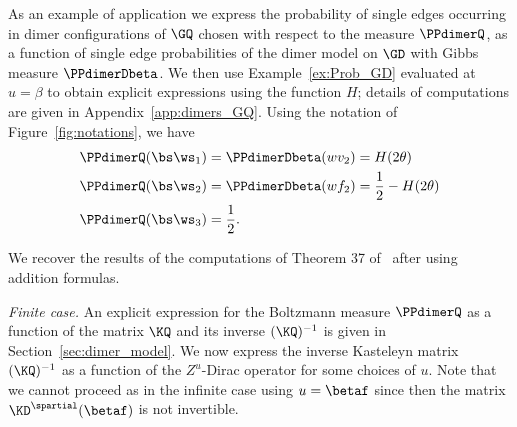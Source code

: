 \documentclass[a4paper,twoside,11pt]{article}
\begin{document}
\begin{exm}\label{ex:proba_GQ}

As an example of application we express the probability of single edges occurring in dimer configurations of $\GQ$ chosen 
with respect to the measure $\PPdimerQ$,
as a function of single edge probabilities of the dimer model on $\GD$ with Gibbs measure
$\PPdimerDbeta$. We then use Example~\ref{ex:Prob_GD} evaluated at $u=\beta$ to obtain explicit expressions using the function $H$;
details of computations are given in Appendix~\ref{app:dimers_GQ}. Using the notation of Figure~\ref{fig:notations}, we have
\begin{align*}
\PPdimerQ(\bs\ws_1)&=\PPdimerDbeta(wv_2)=H(2\theta)\\ 
\PPdimerQ(\bs\ws_2)&=\PPdimerDbeta(wf_2)=\frac{1}{2}-H(2\theta)\\ 
\PPdimerQ(\bs\ws_3)&=\frac{1}{2}.
\end{align*}
\end{exm}
We recover the results of the computations of Theorem 37 of~\cite{BdtR2} after using addition formulas.



\emph{Finite case.} An explicit expression for the Boltzmann measure $\PPdimerQ$
as a function of the matrix $\KQ$ and its inverse $(\KQ)^{-1}$ is given in Section~\ref{sec:dimer_model}. We now express the inverse Kasteleyn matrix
$(\KQ)^{-1}$ as a function of the $Z^u$-Dirac operator for some choices of $u$.
Note that we cannot proceed as in the infinite case using $u=\betaf$ since then the matrix $\KD^\spartial(\betaf)$ is not invertible.
\end{document}
